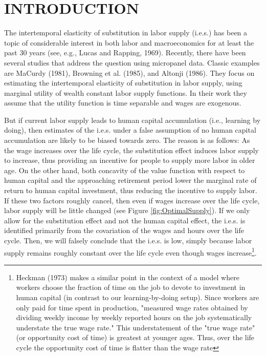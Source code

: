 \documentclass{article}
\begin{document}
\section{INTRODUCTION}
\label{section:intro}
\quad The intertemporal elasticity of substitution in labor supply (i.e.s.) has been a topic of considerable interest in both labor and macroeconomics for at least the past 30 years (see, e.g., Lucas and Rapping, 1969). Recently, there have been several studies that address the question using micropanel data. Classic examples are MaCurdy (1981), Browning et al. (1985), and Altonji (1986). They focus on estimating the intertemporal elasticity of substitution in labor supply, using marginal utility of wealth constant labor supply functions. In their work they assume that the utility function is time separable and wages are exogenous.\par
But if current labor supply leads to human capital accumulation (i.e., learning by doing), then estimates of the i.e.s. under a false assumption of no human capital accumulation are likely to be biased towards zero. The reason is as follows: As the wage increases over the life cycle, the substitution effect induces labor supply to increase, thus providing an incentive for people to supply more labor in older age. On the other hand, both concavity of the value function with respect to human capital and the approaching retirement period lower the marginal rate of return to human capital investment, thus reducing the incentive to supply labor. If these two factors roughly cancel, then even if wages increase over the life cycle, labor supply will be little changed (see Figure \ref{fig:OptimalSupply}). If we only allow for the substitution effect and not the human capital effect, the i.e.s. is identified primarily from the covariation of the wages and hours over the life cycle. Then, we will falsely conclude that the i.e.s. is low, simply because labor supply remains roughly constant over the life cycle even though wages increase\footnote[2]{Heckman (1973) makes a similar point in the context of a model where workers choose the fraction of time on the job to devote to investment in human capital (in contrast to our learning-by-doing setup). Since workers are only paid for time spent in production, "measured wage rates obtained by dividing weekly income by weekly reported hours on the job systematically understate the true wage rate." This understatement of the "true wage rate" (or opportunity cost of time) is greatest at younger ages. Thus, over the life cycle the opportunity cost of time is flatter than the wage rate}. \par
\end{document}
